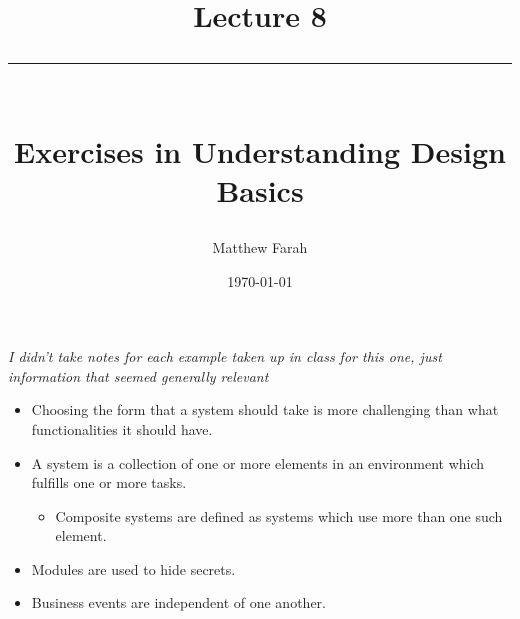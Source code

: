 \documentclass{article}
\date{
	\vspace{-.75em}
	{\large \today}
}
\title{
	\vspace*{-1.5em}
	{\Huge Lecture 8} \\
	\vspace{-1em}
	\rule{\textwidth/4}{.01em} \\
	\vspace{-.25em}
	{\Large Exercises in Understanding Design Basics}
	\vspace{-.75em}
}
\author{
	{\large Matthew Farah}
}
\begin{document}
\maketitle
\pagestyle{fancy}

\fi

\emph{I didn't take notes for each example taken up in class for this one, just information that seemed generally relevant} \\

\begin{itemize}
	\item Choosing the form that a system should take is more challenging than what functionalities it should have.
	\item A system is a collection of one or more elements in an environment which fulfills one or more tasks.
	\begin{itemize}
		\item Composite systems are defined as systems which use more than one such element.
	\end{itemize}
	\item Modules are used to hide secrets.
	\item Business events are independent of one another.
\end{itemize}

\ifdefined\iscombined
	\newpage
\else
	
\end{document}
